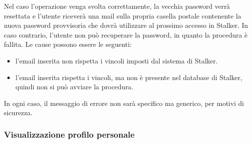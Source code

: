 \documentclass[../manuale-utente.tex]{subfiles}
\begin{document}
Nel caso l'operazione venga svolta correttamente, la vecchia password verrà resettata e l'utente riceverà una mail sulla propria casella postale contenente la nuova password provvisoria che dovrà utilizzare al prossimo accesso in Stalker.
In caso contrario, l'utente non può recuperare la password, in quanto la procedura è fallita.
Le cause possono essere le seguenti:
\begin{itemize}
    \item l'email inserita non rispetta i vincoli imposti dal sistema di Stalker.
    \item l'email inserita rispetta i vincoli, ma non è presente nel database di Stalker, quindi non si può avviare la procedura.
\end{itemize}
In ogni caso, il messaggio di errore non sarà specifico ma generico, per motivi di sicurezza.

\subsubsection{Visualizzazione profilo personale}%
\label{subs:visualizzazione_profilo_personale}
\end{document}

